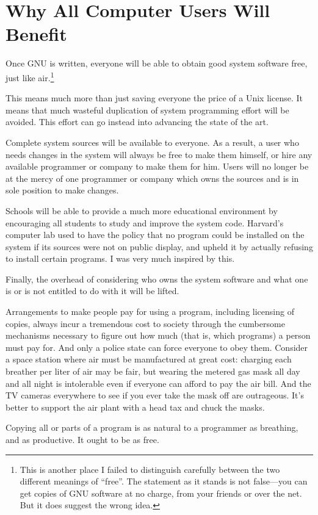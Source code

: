 \section{Why All Computer Users Will Benefit}
Once GNU is written, everyone will be able to obtain good system software free, just like air.\footnote{This is another place I failed to distinguish carefully between the two different meanings of “free”. The statement as it stands is not false—you can get copies of GNU software at no charge, from your friends or over the net. But it does suggest the wrong idea.}\par
This means much more than just saving everyone the price of a Unix license. It means that much wasteful duplication of system programming effort will be avoided. This effort can go instead into advancing the state of the art.\par
Complete system sources will be available to everyone. As a result, a user who needs changes in the system will always be free to make them himself, or hire any available programmer or company to make them for him. Users will no longer be at the mercy of one programmer or company which owns the sources and is in sole position to make changes.\par
Schools will be able to provide a much more educational environment by encouraging all students to study and improve the system code. Harvard's computer lab used to have the policy that no program could be installed on the system if its sources were not on public display, and upheld it by actually refusing to install certain programs. I was very much inspired by this.\par
Finally, the overhead of considering who owns the system software and what one is or is not entitled to do with it will be lifted.\par
Arrangements to make people pay for using a program, including licensing of copies, always incur a tremendous cost to society through the cumbersome mechanisms necessary to figure out how much (that is, which programs) a person must pay for. And only a police state can force everyone to obey them. Consider a space station where air must be manufactured at great cost: charging each breather per liter of air may be fair, but wearing the metered gas mask all day and all night is intolerable even if everyone can afford to pay the air bill. And the TV cameras everywhere to see if you ever take the mask off are outrageous. It's better to support the air plant with a head tax and chuck the masks.\par
Copying all or parts of a program is as natural to a programmer as breathing, and as productive. It ought to be as free.
